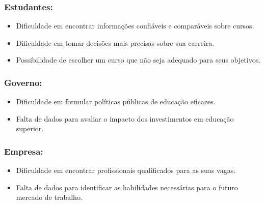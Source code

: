 \documentclass[a4paper,12pt]{article}
\begin{document}
\subsubsection{Estudantes:}
\begin{itemize}
    \item Dificuldade em encontrar informações confiáveis e comparáveis sobre cursos.
    \item Dificuldade em tomar decisões mais precisas sobre sua carreira.
    \item Possibilidade de escolher um curso que não seja adequado para seus objetivos.
\end{itemize}

\subsubsection{Governo:}
\begin{itemize}
    \item Dificuldade em formular políticas públicas de educação eficazes.
    \item Falta de dados para avaliar o impacto dos investimentos em educação superior.
\end{itemize}

\subsubsection{Empresa:}
\begin{itemize}
    \item Dificuldade em encontrar profissionais qualificados para as suas vagas.
    \item Falta de dados para identificar as habilidades necessárias para o futuro mercado de trabalho.
\end{itemize}
\end{document}
